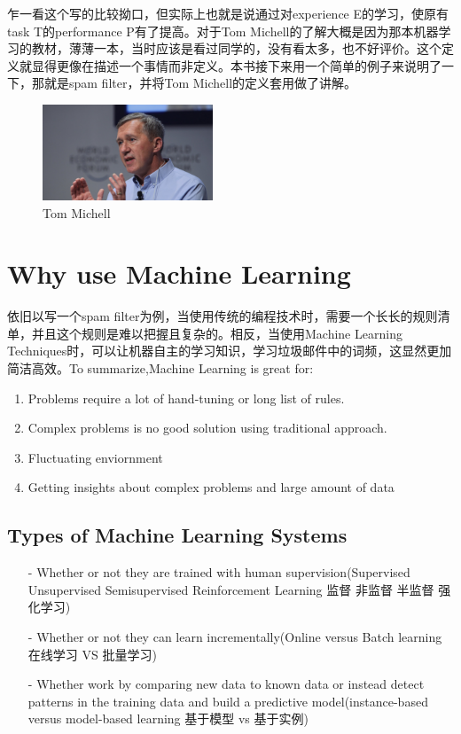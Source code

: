 \documentclass[UTF8]{ctexart}
\begin{document}
乍一看这个写的比较拗口，但实际上也就是说通过对experience E的学习，使原有task T的performance P有了提高。对于Tom Michell的了解大概是因为那本机器学习的教材，薄薄一本，当时应该是看过同学的，没有看太多，也不好评价。这个定义就显得更像在描述一个事情而非定义。本书接下来用一个简单的例子来说明了一下，那就是spam filter，并将Tom Michell的定义套用做了讲解。
\begin{figure}[H]
\centering
\includegraphics[width = 2in]{TomWEF2017.jpg}
\caption{Tom Michell}
\end{figure}

\section{Why use Machine Learning}
依旧以写一个spam filter为例，当使用传统的编程技术时，需要一个长长的规则清单，并且这个规则是难以把握且复杂的。相反，当使用Machine Learning Techniques时，可以让机器自主的学习知识，学习垃圾邮件中的词频，这显然更加简洁高效。To summarize,Machine Learning is great for:
\begin{enumerate}

\item Problems require a lot of hand-tuning or long list of rules.

\item Complex problems is no good solution using traditional approach.

\item Fluctuating enviornment

\item Getting insights about complex problems and large amount of data
\end{enumerate}

\subsection{Types of Machine Learning Systems}
\begin{itemize}
	\item[-] Whether or not they are trained with human supervision(Supervised Unsupervised Semisupervised Reinforcement Learning 监督 非监督 半监督 强化学习)

	\item[-] Whether or not they can learn incrementally(Online versus Batch learning 在线学习 VS 批量学习)

	\item[-] Whether work by comparing new data to  known data or instead detect patterns in the training data and build a predictive model(instance-based versus model-based learning 基于模型 vs 基于实例)

\end{itemize}
\end{document}

